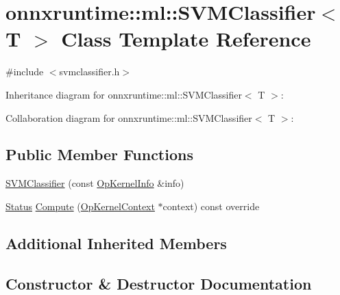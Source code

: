 \hypertarget{classonnxruntime_1_1ml_1_1SVMClassifier}{}\section{onnxruntime\+:\+:ml\+:\+:S\+V\+M\+Classifier$<$ T $>$ Class Template Reference}
\label{classonnxruntime_1_1ml_1_1SVMClassifier}


{\ttfamily \#include $<$svmclassifier.\+h$>$}



Inheritance diagram for onnxruntime\+:\+:ml\+:\+:S\+V\+M\+Classifier$<$ T $>$\+:


Collaboration diagram for onnxruntime\+:\+:ml\+:\+:S\+V\+M\+Classifier$<$ T $>$\+:
\subsection*{Public Member Functions}
\begin{DoxyCompactItemize}
\item 
\mbox{\hyperlink{classonnxruntime_1_1ml_1_1SVMClassifier_a3218ca8f03d5f41b86516f36dda82cbd}{S\+V\+M\+Classifier}} (const \mbox{\hyperlink{classonnxruntime_1_1OpKernelInfo}{Op\+Kernel\+Info}} \&info)
\item 
\mbox{\hyperlink{classonnxruntime_1_1common_1_1Status}{Status}} \mbox{\hyperlink{classonnxruntime_1_1ml_1_1SVMClassifier_ace2369bbab979ef247c5c9994e07c547}{Compute}} (\mbox{\hyperlink{classonnxruntime_1_1OpKernelContext}{Op\+Kernel\+Context}} $\ast$context) const override
\end{DoxyCompactItemize}
\subsection*{Additional Inherited Members}


\subsection{Constructor \& Destructor Documentation}
\mbox{\label{classonnxruntime_1_1ml_1_1SVMClassifier_a3218ca8f03d5f41b86516f36dda82cbd}} 
